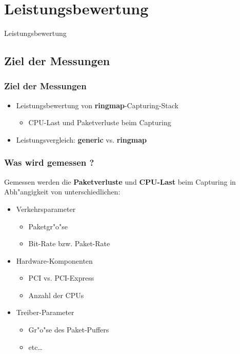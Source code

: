 \documentclass{beamer}
\begin{document}
\section{Leistungsbewertung}
\begin{frame}
	\begin{center}
	\huge{Leistungsbewertung}
	\end{center}
\end{frame}

\subsection*{Ziel der Messungen}

\begin{frame}
\frametitle{Ziel der Messungen}
\begin{itemize}
	\item Leistungsbewertung von \textbf{ringmap}-Capturing-Stack
		\begin{itemize}
			\item CPU-Last und Paketverluste beim Capturing\newline
		\end{itemize}
	\item Leistungsvergleich: \textbf{generic} vs. \textbf{ringmap}
\end{itemize}
\end{frame}

\begin{frame}
\frametitle{Was wird gemessen ?}
Gemessen werden  die \textbf{Paketverluste} und \textbf{CPU-Last} beim
Capturing in Abh"angigkeit von unterschiedlichen:\newline
\begin{itemize}
	\item Verkehrsparameter
		\begin{itemize}
			\item Paketgr"o"se
			\item Bit-Rate bzw. Paket-Rate
		\end{itemize}

\color{gray}
	\item  Hardware-Komponenten
		\begin{itemize}
\color{gray}
			\item PCI vs. PCI-Express
			\item Anzahl der CPUs
		\end{itemize}
	\item Treiber-Parameter
		\begin{itemize}
\color{gray}
			\item Gr"o"se des Paket-Puffers
			\item etc\ldots
		\end{itemize}
\end{itemize}
\normalcolor
\end{frame}
\end{document}
